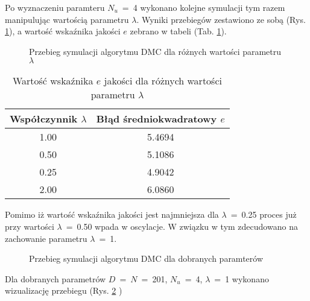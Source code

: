 Po wyznaczeniu paramteru $N_u$~=~4 wykonano kolejne symulacji tym razem manipulując wartością parametru $\lambda$. Wyniki przebiegów zestawiono ze sobą (Rys. \ref{lambda}), a wartość wskaźnika jakości $e$ zebrano w tabeli (Tab. \ref{elambda}).

\begin{figure}
	
	\centering
	\caption{ Przebieg symulacji algorytmu DMC dla różnych wartości  parametru $\lambda$ }
	
	\label{lambda}
\end{figure}

\begin{table}
	[b] \caption{Wartość wskaźnika $e$ jakości dla różnych wartości parametru $\lambda$}
	\label{elambda}
	\centering
	\begin{small}
		\begin{tabular}{|c|c|}
			\hline 
			Współczynnik $\lambda$ & Błąd średniokwadratowy $e$ \\ 
			\hline 
			\num{1.00} & \num{5.4694} \\ 
			\hline 
			\num{0.50} & \num{5.1086} \\ 
			\hline 
			\num{ 0.25} & \num{4.9042} \\ 
			\hline 
			\num{2.00} &  \num{6.0860} \\ 
			\hline 
		\end{tabular} 
	\end{small}
\end{table}

Pomimo iż wartość wskaźnika jakości jest najmniejsza dla $\lambda$~=~\num{0.25} proces już przy wartości $\lambda$~=~\num{0.50} wpada w oscylacje. W związku w tym zdecudowano na zachowanie parametru $\lambda$~=~1.

\begin{figure}
	
	\centering
	\caption{ Przebieg symulacji algorytmu DMC dla dobranych paramterów }
	
	\label{run}
\end{figure}

Dla dobranych parametrów $D$~=~$N$~=~201, $N_u$~=~4, $\lambda$~=~\num{1} wykonano wizualizację przebiegu (Rys. \ref{run} )

